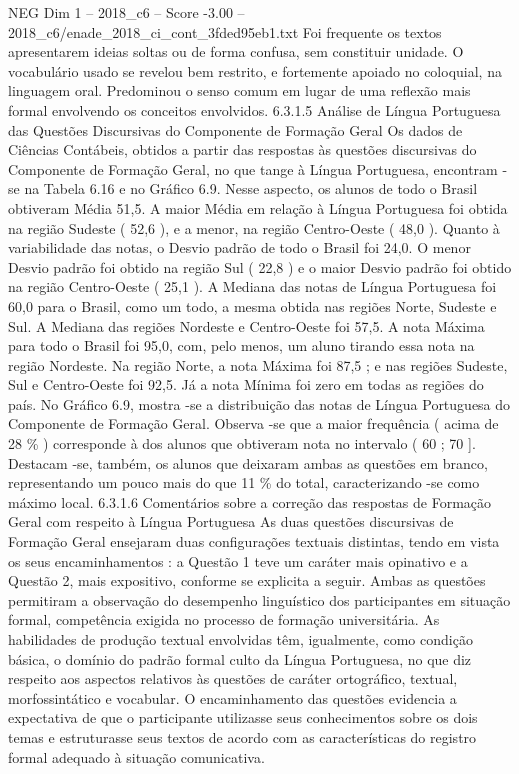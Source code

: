 \begin{textsample}{NEG Dim 1 – 2018\_c6 – Score -3.00 – 2018\_c6/enade\_2018\_ci\_cont\_3fded95eb1.txt}
Foi frequente os textos apresentarem ideias soltas ou de forma confusa, sem constituir unidade.
O vocabulário usado se revelou bem restrito, e fortemente apoiado no coloquial, na linguagem oral.
Predominou o senso comum em lugar de uma reflexão mais formal envolvendo os conceitos envolvidos. 6.3.1.5 Análise de Língua Portuguesa das Questões Discursivas do Componente de Formação Geral Os dados de Ciências Contábeis, obtidos a partir das respostas às questões discursivas do Componente de Formação Geral, no que tange à Língua Portuguesa, encontram -se na Tabela 6.16 e no Gráfico 6.9.
Nesse aspecto, os alunos de todo o Brasil obtiveram Média 51,5.
A maior Média em relação à Língua Portuguesa foi obtida na região Sudeste ( 52,6 ), e a menor, na região Centro-Oeste ( 48,0 ).
Quanto à variabilidade das notas, o Desvio padrão de todo o Brasil foi 24,0.
O menor Desvio padrão foi obtido na região Sul ( 22,8 ) e o maior Desvio padrão foi obtido na região Centro-Oeste ( 25,1 ).
A Mediana das notas de Língua Portuguesa foi 60,0 para o Brasil, como um todo, a mesma obtida nas regiões Norte, Sudeste e Sul.
A Mediana das regiões Nordeste e Centro-Oeste foi 57,5.
A nota Máxima para todo o Brasil foi 95,0, com, pelo menos, um aluno tirando essa nota na região Nordeste.
Na região Norte, a nota Máxima foi 87,5 ; e nas regiões Sudeste, Sul e Centro-Oeste foi 92,5.
Já a nota Mínima foi zero em todas as regiões do país.
No Gráfico 6.9, mostra -se a distribuição das notas de Língua Portuguesa do Componente de Formação Geral.
Observa -se que a maior frequência ( acima de 28 \% ) corresponde à dos alunos que obtiveram nota no intervalo ( 60 ; 70 ].
Destacam -se, também, os alunos que deixaram ambas as questões em branco, representando um pouco mais do que 11 \% do total, caracterizando -se como máximo local. 6.3.1.6 Comentários sobre a correção das respostas de Formação Geral com respeito à Língua Portuguesa As duas questões discursivas de Formação Geral ensejaram duas configurações textuais distintas, tendo em vista os seus encaminhamentos : a Questão 1 teve um caráter mais opinativo e a Questão 2, mais expositivo, conforme se explicita a seguir.
Ambas as questões permitiram a observação do desempenho linguístico dos participantes em situação formal, competência exigida no processo de formação universitária.
As habilidades de produção textual envolvidas têm, igualmente, como condição básica, o domínio do padrão formal culto da Língua Portuguesa, no que diz respeito aos aspectos relativos às questões de caráter ortográfico, textual, morfossintático e vocabular.
O encaminhamento das questões evidencia a expectativa de que o participante utilizasse seus conhecimentos sobre os dois temas e estruturasse seus textos de acordo com as características do registro formal adequado à situação comunicativa.

\end{textsample}
